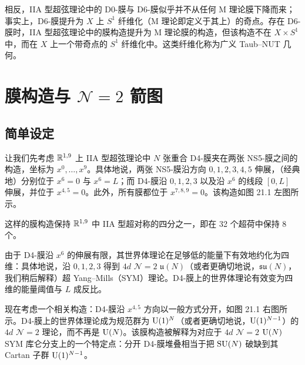 相反，IIA 型超弦理论中的 D0-膜与 D6-膜似乎并不从任何 M 理论膜下降而来；事实上，D6-膜提升为 $X$ 上 $S^1$ 纤维化（M 理论即定义于其上）的奇点。存在 D6-膜时，IIA 型超弦理论中的膜构造提升为 M 理论膜的构造，但该构造不在 $X\times S^1$ 中，而在 $X$ 上一个带奇点的 $S^1$ 纤维化中。这类纤维化称为广义 Taub–NUT 几何。

\section{膜构造与 $\mathcal{N}=2$ 箭图}

\subsection{简单设定}

让我们先考虑 $\mathbb{R}^{1,9}$ 上 IIA 型超弦理论中 $N$ 张重合 D4-膜夹在两张 NS5-膜之间的构造，坐标为 $x^0,\dots,x^9$。具体地说，两张 NS5-膜沿方向 $0,1,2,3,4,5$ 伸展，（经典地）分别位于 $x^6=0$ 与 $x^6=L$；而 D4-膜沿 $0,1,2,3$ 以及沿 $x^6$ 的线段 $[0,L]$ 伸展，并位于 $x^{4,5}=0$。此外，所有膜都位于 $x^{7,8,9}=0$。该构造如图 21.1 左图所示。

\begin{fact}[21.2（见 {{{{[186, 366]}}}}）] 这样的膜构造保持 $\mathbb{R}^{1,9}$ 中 IIA 型超对称的四分之一，即在 32 个超荷中保持 8 个。\end{fact}



由于 D4-膜沿 $x^6$ 的伸展有限，其世界体理论在足够低的能量下有效地约化为四维：具体地说，沿 $0,1,2,3$ 得到 $4d$ $\mathcal{N}=2$ $\mathfrak{u}(N)$（或者更确切地说，$\mathfrak{su}(N)$，我们稍后解释）超 Yang–Mills（SYM）理论。D4-膜上的世界体理论有效变为四维的能量阈值与 $L$ 成反比。

现在考虑一个相关构造：D4-膜沿 $x^{4,5}$ 方向以一般方式分开，如图 21.1 右图所示。D4-膜上的世界体理论成为规范群为 $\operatorname{U}(1)^N$（或者更确切地说，$\operatorname{U}(1)^{N-1}$）的 $4d$ $\mathcal{N}=2$ 理论，而不再是 $\operatorname{U}(N)$。该膜构造被解释为对应于 $4d$ $\mathcal{N}=2$ $\operatorname{U}(N)$ SYM 库仑分支上的一个特定点：分开 D4-膜堆叠相当于把 $\operatorname{SU}(N)$ 破缺到其 Cartan 子群 $\operatorname{U}(1)^{N-1}$。

